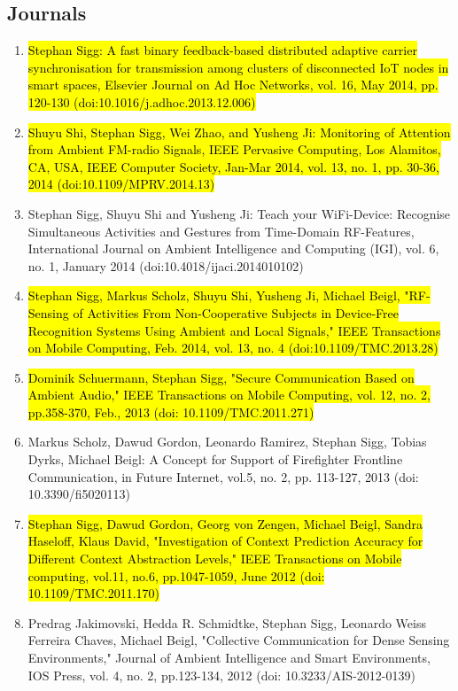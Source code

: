 \documentclass[10pt]{article}
\begin{document}
\subsection*{Journals}
\begin{enumerate}
\item \hl{Stephan Sigg: A fast binary feedback-based distributed adaptive carrier synchronisation for transmission among clusters of disconnected IoT nodes in smart spaces, Elsevier Journal on Ad Hoc Networks, vol. 16, May 2014, pp. 120-130 (doi:10.1016/j.adhoc.2013.12.006)}
\item \hl{Shuyu Shi, Stephan Sigg, Wei Zhao, and Yusheng Ji: Monitoring of Attention from Ambient FM-radio Signals, IEEE Pervasive Computing, Los Alamitos, CA, USA, IEEE Computer Society, Jan-Mar 2014, vol. 13, no. 1, pp. 30-36, 2014 (doi:10.1109/MPRV.2014.13)}
\item Stephan Sigg, Shuyu Shi and Yusheng Ji: Teach your WiFi-Device: Recognise Simultaneous Activities and Gestures from Time-Domain RF-Features, International Journal on Ambient Intelligence and Computing (IGI), vol. 6, no. 1, January 2014 (doi:10.4018/ijaci.2014010102)
\item \hl{Stephan Sigg, Markus Scholz, Shuyu Shi, Yusheng Ji, Michael Beigl, "RF-Sensing of Activities From Non-Cooperative Subjects in Device-Free Recognition Systems Using Ambient and Local Signals," IEEE Transactions on Mobile Computing, Feb. 2014, vol. 13, no. 4 (doi:10.1109/TMC.2013.28)}
\item \hl{Dominik Schuermann, Stephan Sigg, "Secure Communication Based on Ambient Audio," IEEE Transactions on Mobile Computing, vol. 12, no. 2, pp.358-370, Feb., 2013 (doi: 10.1109/TMC.2011.271)}
\item Markus Scholz, Dawud Gordon, Leonardo Ramirez, Stephan Sigg, Tobias Dyrks, Michael Beigl: A Concept for Support of Firefighter Frontline Communication, in Future Internet, vol.5, no. 2, pp. 113-127, 2013 (doi: 10.3390/fi5020113)
\item \hl{Stephan Sigg, Dawud Gordon, Georg von Zengen, Michael Beigl, Sandra Haseloff, Klaus David, "Investigation of Context Prediction Accuracy for Different Context Abstraction Levels," IEEE Transactions on Mobile computing, vol.11, no.6, pp.1047-1059, June 2012 (doi: 10.1109/TMC.2011.170)}
\item Predrag Jakimovski, Hedda R. Schmidtke, Stephan Sigg, Leonardo Weiss Ferreira Chaves, Michael Beigl, "Collective Communication for Dense Sensing Environments," Journal of Ambient Intelligence and Smart Environments, IOS Press, vol. 4, no. 2, pp.123-134, 2012 (doi: 10.3233/AIS-2012-0139)

\end{enumerate}
\end{document}
